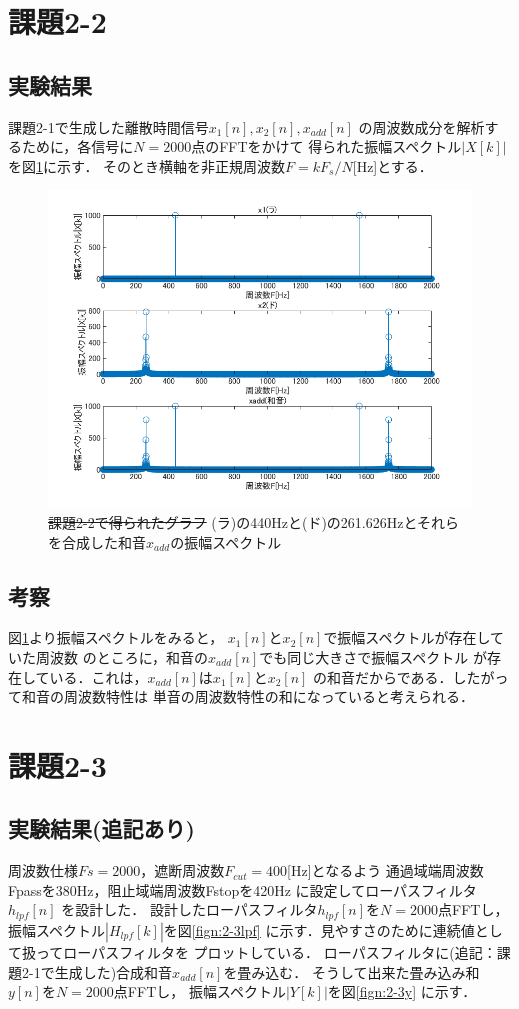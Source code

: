 \documentclass[11pt, a4paper, titlepage]{ltjsarticle}
\begin{document}
\section*{課題2-2}
\subsection*{実験結果}
課題2-1で生成した離散時間信号$x_{1}[n],x_{2}[n],x_{add}[n]$
の周波数成分を解析するために，各信号に$N=2000$点のFFTをかけて
得られた振幅スペクトル$|X[k]|$を図\ref*{fign:2-2}に示す．
そのとき横軸を非正規周波数$F=kF_{s}/N$[Hz]とする．

\begin{figure}[h]
    \centering
    \includegraphics[width=0.9\linewidth]{figures/2-2.png}
    \caption{\sout{課題2-2で得られたグラフ}
    (ラ)の440Hzと(ド)の261.626Hzとそれらを合成した和音$x_{add}$の振幅スペクトル}
    \label{fign:2-2}     
\end{figure}
\subsection*{考察}
図\ref*{fign:2-2}より振幅スペクトルをみると，
$x_{1}[n]$と$x_{2}[n]$で振幅スペクトルが存在していた周波数
のところに，和音の$x_{add}[n]$でも同じ大きさで振幅スペクトル
が存在している．これは，$x_{add}[n]$は$x_{1}[n]$と$x_{2}[n]$
の和音だからである．したがって和音の周波数特性は
単音の周波数特性の和になっていると考えられる．

\newpage
\section*{課題2-3}
\subsection*{実験結果(追記あり)}
周波数仕様$Fs=2000$，遮断周波数$F_{cut}=400$[Hz]となるよう
通過域端周波数Fpassを380Hz，阻止域端周波数Fstopを420Hz
に設定してローパスフィルタ$h_{lpf}[n]$ を設計した．
設計したローパスフィルタ$h_{lpf}[n]$を$N=2000$点FFTし，
振幅スペクトル$|H_{lpf}[k]|$を図\ref*{fign:2-3lpf}
に示す．見やすさのために連続値として扱ってローパスフィルタを
プロットしている．
ローパスフィルタに(追記：課題2-1で生成した)合成和音$x_{add}[n]$を畳み込む．
そうして出来た畳み込み和$y[n]$を$N=2000$点FFTし，
振幅スペクトル$|Y[k]|$を図\ref*{fign:2-3y}
に示す．
\end{document}
